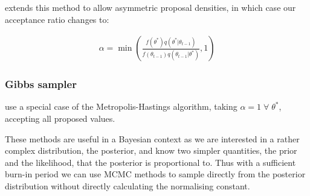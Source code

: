 \documentclass[11pt]{article} %
\begin{document}
\citet{HastingsMonteCarloSampling} extends this method to allow asymmetric proposal densities, in which case our acceptance ratio changes to:

\begin{align} \label{metropolis_hastings_alpha}
\alpha = \min\left(\frac{f(\theta^*) q(\theta^*|\theta_{t-1})}{f(\theta_{t-1})q(\theta_{t-1}|\theta^*)}, 1\right)
\end{align}

\subsubsection{Gibbs sampler}
\citet{GemanStochasticRelaxationGibbs1984} use a special case of the Metropolis-Hastings algorithm, taking $\alpha = 1 \; \forall \; \theta^*$, accepting all proposed values.

These methods are useful in a Bayesian context as we are interested in a rather complex distribution, the posterior, and know two simpler quantities, the prior and the likelihood, that the posterior is proportional to. Thus with a sufficient burn-in period we can use MCMC methods to sample directly from the posterior distribution without directly calculating the normalising constant.

%


\end{document}
